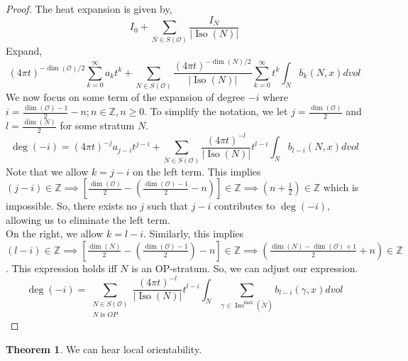 \documentclass[12pt]{article}
\newcommand{\myabs}[1]{\vert#1\vert}
\theoremstyle{definition}
\newtheorem{theorem}{Theorem}[section]
\DeclareMathOperator{\iso}{Iso}
\newcommand{\orb}{\mathcal O}
\begin{document}
\begin{proof}
    The heat expansion is given by,
    \begin{equation*}
        I_0+\sum_{N \in S(\orb)}\frac{I_N}{\myabs{\iso(N)}}
    \end{equation*}
    Expand,
   \begin{equation*}
        {(4\pi t)}^{-\dim(\orb)/2}\sum_{k=0}^{\infty}a_k t^k
        + \sum_{N \in S(\orb)}\frac{{(4\pi t)}^{-\dim(N)/2}}{\myabs{\iso(N)}}
        \sum_{k=0}^{\infty}t^k \int_N b_k(N,x) dvol
   \end{equation*}
   We now focus on some term of the expansion of degree $-i$ where $i = \frac{\dim(\mathcal{O})-1}{2}-n; n \in \mathbb{Z}, n \geq 0$. To simplify the notation, we let $j = \frac{\dim(\orb)}{2}$ and $l = \frac{\dim(N)}{2}$ for some stratum $N$.
   \begin{equation*}
       \deg(-i) = 
        {(4\pi t)}^{-j}a_{j-i} t^{j-i}
        + \sum_{N \in S(\orb)}\frac{{(4\pi t)}^{-l}}{\myabs{\iso(N)}}
        t^{l-i}\int_N b_{l-i}(N,x) dvol
   \end{equation*}
   Note that we allow $k = j-i$ on the left term. This implies $(j-i) \in \mathbb{Z} \implies [ \frac{\dim(\orb)}{2}-(\frac{\dim(\mathcal{O})-1}{2}-n)] \in \mathbb{Z} \implies (n+\frac{1}{2}) \in \mathbb{Z}$ which is impossible. So, there exists no $j$ such that $j-i$ contributes to $\deg(-i)$, allowing us to eliminate the left term.\\
   On the right, we allow $k = l-i$. Similarly, this implies $(l-i) \in \mathbb{Z} \implies [\frac{\dim(N)}{2} - (\frac{\dim(\orb)-1}{2})-n] \in \mathbb{Z} \implies (\frac{\dim(N) - \dim(\orb) +1}{2} + n) \in \mathbb{Z}$. This expression holds iff $N$ is an OP-stratum. So, we can adjust our expression.
    \begin{equation*}
        \deg(-i)=\sum_{\substack{N \in S(\orb) \\ N \text{ is } OP}}
        \frac{{(4\pi t)}^{-l}}{\myabs{\iso(N)}} t^{l-i} 
        \int_N \sum_{\gamma \in \iso^{\max}(\tilde{N})} 
        b_{l-i}(\gamma,x)dvol
    \end{equation*}

\end{proof}

\begin{theorem}  We can hear local orientability.
\end{theorem}
\end{document}

